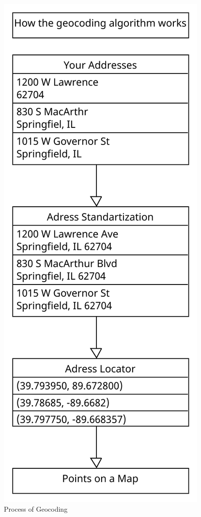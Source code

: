 \documentclass[10pt,oneside,english,a4paper]{article}
\begin{document}
\begin{figure}[h]
	\centering
	\includegraphics[scale=0.5]{diagram1.pdf}
	\caption{Process of Geocoding}
	\label{fig:geocoding}
\end{figure}
\end{document}
